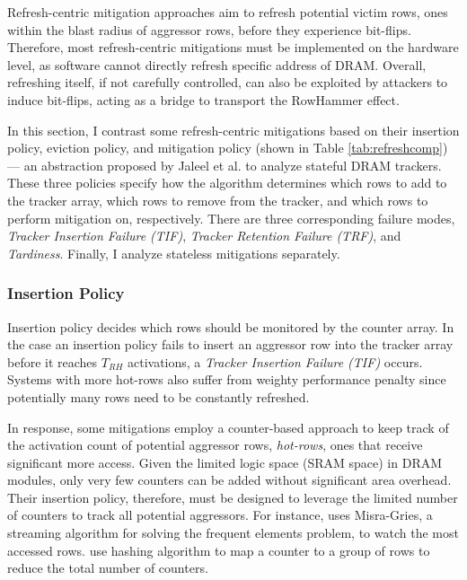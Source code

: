 \documentclass[journal,twocolumn]{IEEEtran}
\begin{document}
	Refresh-centric mitigation approaches aim to refresh potential victim rows, ones within the blast radius of aggressor rows, before they experience bit-flips. Therefore, most refresh-centric mitigations must be implemented on the hardware level, as software cannot directly refresh specific address of DRAM. Overall, refreshing itself, if not carefully controlled, can also be exploited by attackers to induce bit-flips, acting as a bridge to transport the RowHammer effect\cite{Kogler22}.
	
	In this section, I contrast some refresh-centric mitigations based on their insertion policy, eviction policy, and mitigation policy (shown in Table \ref{tab:refreshcomp}) --- an abstraction proposed by Jaleel et al.\cite{Jaleel24} to analyze stateful DRAM trackers. These three policies specify how the algorithm determines which rows to add to the tracker array, which rows to remove from the tracker, and which rows to perform mitigation on, respectively. There are three corresponding failure modes, \textit{Tracker Insertion Failure (TIF)}, \textit{Tracker Retention Failure (TRF)}, and \textit{Tardiness}. Finally, I analyze stateless mitigations separately.
	
	\subsubsection{Insertion Policy}
	
	Insertion policy decides which rows should be monitored by the counter array. In the case an insertion policy fails to insert an aggressor row into the tracker array before it reaches $T_{RH}$ activations, a \textit{Tracker Insertion Failure (TIF)} occurs. Systems with more hot-rows also suffer from weighty performance penalty since potentially many rows need to be constantly refreshed. 
	
	In response, some mitigations \cite{Kim23,Bostanci24} employ a counter-based approach to keep track of the activation count of potential aggressor rows, \textit{hot-rows}, ones that receive significant more access. Given the limited logic space (SRAM space) in DRAM modules, only very few counters can be added without significant area overhead. Their insertion policy, therefore, must be designed to leverage the limited number of counters to track all potential aggressors. For instance, \cite{Kim23} uses Misra-Gries, a streaming algorithm for solving the frequent elements problem, to watch the most accessed rows. \cite{Bostanci24, Nazaraliyev25} use hashing algorithm to map a counter to a group of rows to reduce the total number of counters.
	
\end{document}
